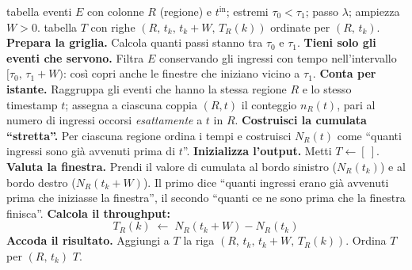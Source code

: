 \begin{algorithm}[ht]
  \caption{Throughput per regione.}
  \label{alg:throughput-anyW-naturale}
  \begin{algorithmic}[1]
    \Require tabella eventi $E$ con colonne $R$ (regione) e $t^{\mathrm{in}}$; estremi $\tau_0<\tau_1$; passo $\lambda$; ampiezza $W>0$.
    \Ensure tabella $T$ con righe $(R,\,t_k,\,t_k+W,\,T_R(k))$ ordinate per $(R,\,t_k)$.
    \EnsureEndSkip{}
    \State \textbf{Prepara la griglia.} Calcola quanti passi stanno tra $\tau_0$ e $\tau_1$.
    \State \textbf{Tieni solo gli eventi che servono.} Filtra $E$ conservando gli ingressi con tempo nell’intervallo $[\tau_0,\,\tau_1{+}W)$: così copri anche le finestre che iniziano vicino a $\tau_1$.
    \State \textbf{Conta per istante.} Raggruppa gli eventi che hanno la stessa regione $R$ e lo stesso timestamp $t$; assegna a ciascuna coppia $(R,t)$ il conteggio $n_R(t)$, pari al numero di ingressi occorsi \emph{esattamente} a $t$ in $R$.
    \State \textbf{Costruisci la cumulata “stretta”.} Per ciascuna regione ordina i tempi e costruisci $N_R(t)$ come “quanti ingressi sono già avvenuti prima di $t$”.
    \State \textbf{Inizializza l’output.} Metti $T \gets [\ ]$.
        \State \textbf{Valuta la finestra.} Prendi il valore di cumulata al bordo sinistro ($N_R(t_k)$) e al bordo destro ($N_R(t_k{+}W)$). Il primo dice “quanti ingressi erano già avvenuti prima che iniziasse la finestra”, il secondo “quanti ce ne sono prima che la finestra finisca”.
        \State \textbf{Calcola il throughput:}
            \[
                T_R(k) \;\gets\; N_R(t_k{+}W) - N_R(t_k)
            \]
        \State \textbf{Accoda il risultato.} Aggiungi a $T$ la riga $(R,\,t_k,\,t_k{+}W,\,T_R(k))$.
      \EndFor
    \EndFor
    \State Ordina $T$ per $(R,\,t_k)$
    \Return $T$.
  \end{algorithmic}
\end{algorithm}
